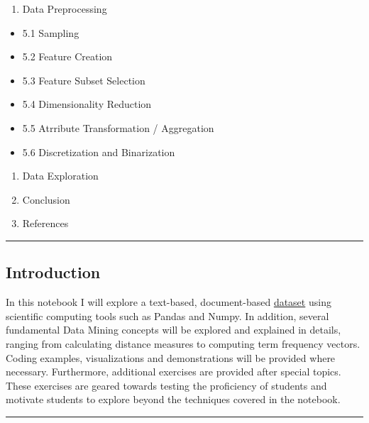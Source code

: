 \documentclass[11pt]{article}
\providecommand{\tightlist}{%
      \setlength{\itemsep}{0pt}\setlength{\parskip}{0pt}}
\begin{document}
\begin{enumerate}
\def\labelenumi{\arabic{enumi}.}
\setcounter{enumi}{4}
\tightlist
\item
  Data Preprocessing
\end{enumerate}

\begin{itemize}
\tightlist
\item
  5.1 Sampling
\item
  5.2 Feature Creation
\item
  5.3 Feature Subset Selection
\item
  5.4 Dimensionality Reduction
\item
  5.5 Atrribute Transformation / Aggregation
\item
  5.6 Discretization and Binarization
\end{itemize}

\begin{enumerate}
\def\labelenumi{\arabic{enumi}.}
\setcounter{enumi}{5}
\tightlist
\item
  Data Exploration
\item
  Conclusion
\item
  References
\end{enumerate}

    \begin{center}\rule{0.5\linewidth}{\linethickness}\end{center}

    \hypertarget{introduction}{%
\subsection{Introduction}\label{introduction}}

In this notebook I will explore a text-based, document-based
\href{http://scikit-learn.org/stable/tutorial/text_analytics/working_with_text_data.html}{dataset}
using scientific computing tools such as Pandas and Numpy. In addition,
several fundamental Data Mining concepts will be explored and explained
in details, ranging from calculating distance measures to computing term
frequency vectors. Coding examples, visualizations and demonstrations
will be provided where necessary. Furthermore, additional exercises are
provided after special topics. These exercises are geared towards
testing the proficiency of students and motivate students to explore
beyond the techniques covered in the notebook.

    \begin{center}\rule{0.5\linewidth}{\linethickness}\end{center}
\end{document}
